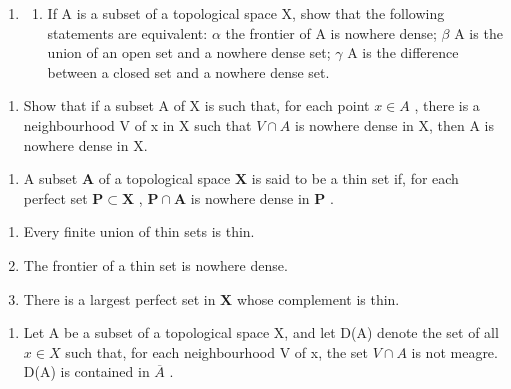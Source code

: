 \ExerciseSection

\begin{enumerate}
\def\labelenumi{\arabic{enumi})}
\tightlist
\item
  \begin{enumerate}
  \def\labelenumii{\alph{enumii})}
  \tightlist
  \item
    If A is a subset of a topological space X, show that the following statements are equivalent: \(\alpha\) the frontier of A is nowhere dense; \(\beta\) A is the union of an open set and a nowhere dense set; \(\gamma\) A is the difference between a closed set and a nowhere dense set.
  \end{enumerate}
\end{enumerate}

\begin{enumerate}
\def\labelenumi{\alph{enumi})}
\setcounter{enumi}{1}
\tightlist
\item
  Show that if a subset A of X is such that, for each point \(x \in A\) , there is a neighbourhood V of x in X such that \(V \cap A\) is nowhere dense in X, then A is nowhere dense in X.
\end{enumerate}

\begin{enumerate}
\def\labelenumi{\arabic{enumi})}
\setcounter{enumi}{1}
\tightlist
\item
  A subset \(\mathbf{A}\) of a topological space \(\mathbf{X}\) is said to be a thin set if, for each perfect set \(\mathbf{P} \subset \mathbf{X}\) , \(\mathbf{P} \cap \mathbf{A}\) is nowhere dense in \(\mathbf{P}\) .
\end{enumerate}

\begin{enumerate}
\def\labelenumi{\alph{enumi})}
\item
  Every finite union of thin sets is thin.
\item
  The frontier of a thin set is nowhere dense.
\item
  There is a largest perfect set in \(\mathbf{X}\) whose complement is thin.
\end{enumerate}

\begin{enumerate}
\def\labelenumi{\arabic{enumi})}
\setcounter{enumi}{2}
\tightlist
\item
  Let A be a subset of a topological space X, and let D(A) denote the set of all \(x \in X\) such that, for each neighbourhood V of x, the set \(V \cap A\) is not meagre. D(A) is contained in \(\overline{A}\) .
\end{enumerate}

